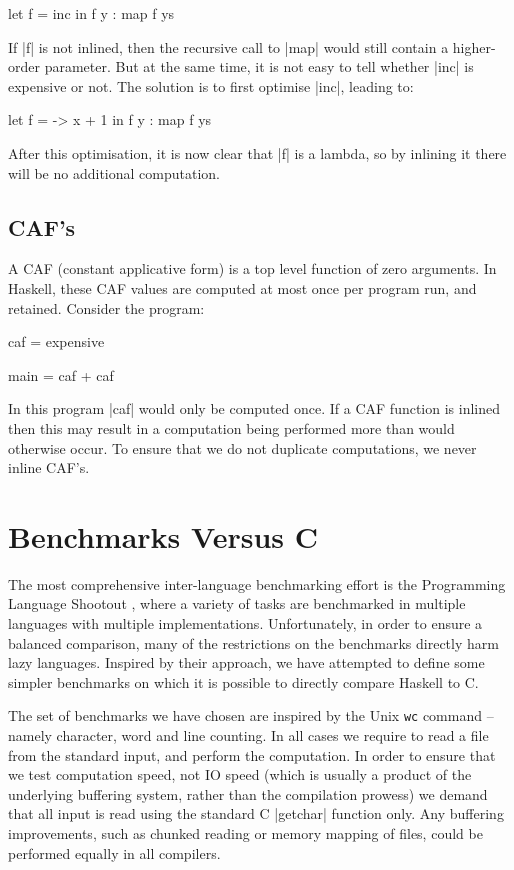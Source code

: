 \documentclass{llncs}
\begin{document}
\begin{code}
let f = inc
in f y : map f ys
\end{code}

If |f| is not inlined, then the recursive call to |map| would still contain a higher-order parameter. But at the same time, it is not easy to tell whether |inc| is expensive or not. The solution is to first optimise |inc|, leading to:

\begin{code}
let f = \x -> x + 1
in f y : map f ys
\end{code}

After this optimisation, it is now clear that |f| is a lambda, so by inlining it there will be no additional computation.

\subsection{CAF's}
\label{sec:caf}

A CAF (constant applicative form) is a top level function of zero arguments. In Haskell, these CAF values are computed at most once per program run, and retained. Consider the program:

\begin{code}
caf = expensive

main = caf + caf
\end{code}

In this program |caf| would only be computed once. If a CAF function is inlined then this may result in a computation being performed more than would otherwise occur. To ensure that we do not duplicate computations, we never inline CAF's.

\section{Benchmarks Versus C}

The most comprehensive inter-language benchmarking effort is the Programming Language Shootout \cite{shootout}, where a variety of tasks are benchmarked in multiple languages with multiple implementations. Unfortunately, in order to ensure a balanced comparison, many of the restrictions on the benchmarks directly harm lazy languages. Inspired by their approach, we have attempted to define some simpler benchmarks on which it is possible to directly compare Haskell to C.

The set of benchmarks we have chosen are inspired by the Unix \texttt{wc} command -- namely character, word and line counting. In all cases we require to read a file from the standard input, and perform the computation. In order to ensure that we test computation speed, not IO speed (which is usually a product of the underlying buffering system, rather than the compilation prowess) we demand that all input is read using the standard C |getchar| function only. Any buffering improvements, such as chunked reading or memory mapping of files, could be performed equally in all compilers.
\end{document}
